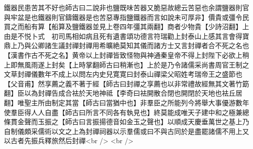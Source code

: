 鐵器民患苦其不好也師古曰二說非也鹽既味苦器又脆惡故總云苦惡也余謂鹽器則官與牢盆是也鐵器則官鑄鐵器是也苦惡專指鹽鐵器而言如說未可厚非】價貴或彊令民買之而船有算【船算及鹽鐵器並見上卷四年彊其兩翻】商者少物貴【少詩沼翻】上由是不悦卜式　初司馬相如病且死有遺書頌功德言符瑞勸上封泰山上感其言會得寶鼎上乃與公卿諸生議封禪封禪用希曠絶莫知其儀而諸方士又言封禪者合不死之名也【漢書作古不死之名】黄帝以上封禪皆致怪物與神通秦皇帝不得上封陛下必欲上稍上即無風雨遂上封矣【上時掌翻師古曰稍漸也】上於是乃令諸儒采尚書周官王制之文草封禪儀數年不成上以問左内史兒寛寛曰封泰山禪梁父昭姓考瑞帝王之盛節也【父音甫】然享薦之義不著于經【師古曰封禪之享薦也以非常禮故經無其文著竹筯翻】臣以為封禪告成合袪於天地神祗【李奇曰袪開散合閉也開閉於天地也袪丘居翻】唯聖主所由制定其當【師古曰當猶中也】非羣臣之所能列今將舉大事優游數年使羣臣得人人自盡【師古曰所言不同各有執見也】終莫能成唯天子建中和之極兼總條貫金聲而玉振之【師古曰言振揚德音如金玉之聲也】以順成天慶垂萬世之基上乃自制儀頗采儒術以文之上為封禪祠器以示羣儒或曰不與古同於是盡罷諸儒不用上又以古者先振兵釋旅然后封禪<br />
<br />

